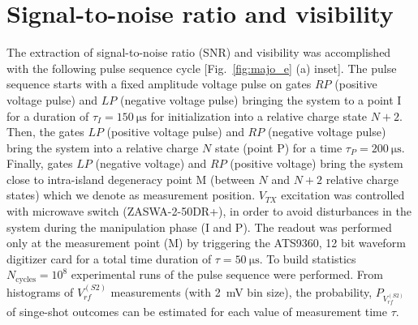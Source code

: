 \section{Signal-to-noise ratio and visibility}
\label{sec:majo_C}
The extraction of signal-to-noise ratio (SNR) and visibility was accomplished with the following pulse sequence cycle [Fig.~\ref{fig:majo_e} (a) inset]. The pulse sequence starts with a fixed amplitude voltage pulse on gates $RP$ (positive voltage pulse) and $LP$ (negative voltage pulse) bringing the system to a point I for a duration of $\tau_{I} = \SI{150}{\micro\second}$ for initialization into a relative charge state $N+2$. Then, the gates $LP$ (positive voltage pulse) and $RP$ (negative voltage pulse) bring the system into a relative charge $N$ state (point P) for a time $\tau_{P} = \SI{200}{\micro\second}$. Finally, gates $LP$ (negative voltage) and $RP$ (positive voltage) bring the system close to intra-island degeneracy point M (between $N$ and $N+2$ relative charge states) which we denote as measurement position. $V_{TX}$ excitation was controlled with microwave switch (ZASWA-2-50DR+), in order to avoid disturbances in the system during the manipulation phase (I and P). The readout was performed only at the measurement point (M) by triggering the ATS9360, 12 bit waveform digitizer card for a total time duration of $\tau = \SI{50}{\micro\second}$.  To build statistics $N_\textrm{cycles} = 10^8$ experimental runs of the pulse sequence were performed. From histograms of $V^{(S2)}_{rf}$ measurements (with \SI{2}{\milli\volt} bin size), the probability, $P_{V^{(S2)}_{rf}}$ of singe-shot outcomes can be estimated for each value of measurement time $\tau$.

